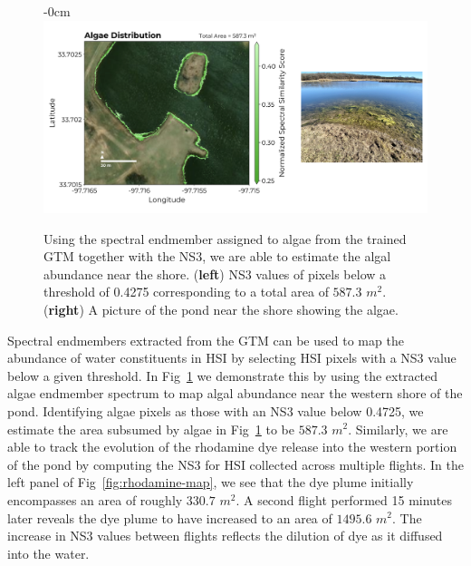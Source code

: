 \documentclass[remotesensing,article,submit,pdftex,moreauthors]{Definitions/mdpi}
\begin{document}
\begin{figure}[t]
\begin{adjustwidth}{-\extralength}{0cm}
\centering
\includegraphics[width=17.0cm]{paper/figures/results/algae.png}
\end{adjustwidth}
\caption{Using the spectral endmember assigned to algae from the trained GTM together with the NS3, we are able to estimate the algal abundance near the shore. (\textbf{left}) NS3 values of pixels below a threshold of 0.4275 corresponding to a total area of $587.3$ $m^2$. (\textbf{right}) A picture of the pond near the shore showing the algae.\label{fig:algae-map}}
\end{figure}  

Spectral endmembers extracted from the GTM can be used to map the abundance of water constituents in HSI by selecting HSI pixels with a NS3 value below a given threshold. In Fig~\ref{fig:algae-map} we demonstrate this by using the extracted algae endmember spectrum to map algal abundance near the western shore of the pond. Identifying algae pixels as those with an NS3 value below 0.4725, we estimate the area subsumed by algae in Fig~\ref{fig:algae-map} to be $587.3$ $m^2$. Similarly, we are able to track the evolution of the rhodamine dye release into the western portion of the pond by computing the NS3 for HSI collected across multiple flights. In the left panel of Fig~\ref{fig:rhodamine-map}, we see that the dye plume initially encompasses an area of roughly $330.7$ $m^2$. A second flight performed 15 minutes later reveals the dye plume to have increased to an area of $1495.6$ $m^2$. The increase in NS3 values between flights reflects the dilution of dye as it diffused into the water.


\newpage 
\end{document}
